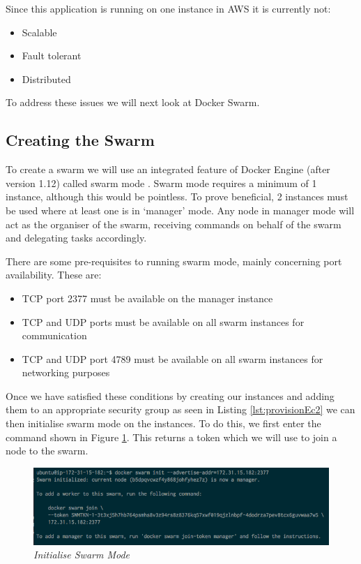 \documentclass{article}
\begin{document}
Since this application is running on one instance in AWS it is currently not:

\begin{itemize}
  \item Scalable
  \item Fault tolerant
  \item Distributed
\end{itemize}

To address these issues we will next look at Docker Swarm.

\newpage
\subsection{Creating the Swarm}
\label{subs:creating_swarm}
To create a swarm we will use an integrated feature of Docker Engine (after version 1.12) called swarm mode \citep{SwarmEngine2016}. Swarm mode requires a minimum of 1 instance, although this would be pointless. To prove beneficial, 2 instances must be used where at least one is in `manager' mode. Any node in manager mode will act as the organiser of the swarm, receiving commands on behalf of the swarm and delegating tasks accordingly.

There are some pre-requisites to running swarm mode, mainly concerning port availability. These are:

\begin{itemize}
  \item TCP port 2377 must be available on the manager instance
  \item TCP and UDP ports must be available on all swarm instances for communication
  \item TCP and UDP port 4789 must be available on all swarm instances for networking purposes
\end{itemize}

Once we have satisfied these conditions by creating our instances and adding them to an appropriate security group as seen in Listing \ref{lst:provisionEc2} we can then initialise swarm mode on the instances. To do this, we first enter the command shown in Figure \ref{fig:swarm_init}. This returns a token which we will use to join a node to the swarm.

\begin{figure}[!h]
\centering
\includegraphics*[width=\textwidth]{components/images/swarm_init}
\caption{\em Initialise Swarm Mode}
\label{fig:swarm_init}
\end{figure}
\end{document}
